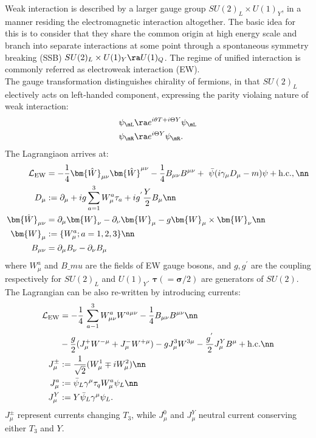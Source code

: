 Weak interaction is described by a larger gauge group $SU(2)_L \times U(1)_Y$, in a manner residing the electromagnetic interaction altogether. The basic idea for this is to consider that they share the common origin at high energy scale and branch into separate interactions at some point through a spontaneous symmetry breaking (SSB) $SU(2)_L \times U(1)_Y \ra U(1)_Q$.
The regime of unified interaction is commonly referred as electroweak interaction (EW). \\

The gauge transformation distinguishes chirality of fermions, in that $SU(2)_L$ electively acts on left-handed component, expressing the parity violaing nature of weak interaction:
\begin{align}
& \psi_{\mL} \ra e^{i\theta T+i\Theta Y} \psi_{\mL}   \\
& \psi_{\mR} \ra e^{i\Theta Y} \psi_{\mR}.
\end{align}
The Lagrangiaon arrives at:
\begin{align}
\mathcal{L}_{\mathrm{EW}} & = -\frac{1}{4} \bm{\hat{W}}_{\mu\nu} \bm{\hat{W}}^{\mu\nu}-\frac{1}{4}B_{\mu\nu} B^{\mu\nu} + \,\, \bar{\psi}(i \gamma_\mu D_\mu - m) \psi + \mathrm{h.c.}, \nn \\
%
D_\mu & := \partial_\mu + ig \sum_{a=1}^3 W^a_{\mu} \tau_a  + ig^{'} \frac{Y}{2} B_\mu \nn \\
\bm{\hat{W}}_{\mu\nu} & = \partial_\mu \bm{W}_\nu - \partial_\nu \bm{W}_\mu - g \bm{W}_\mu \times \bm{W}_\nu \nn \\
\bm{W}_\mu & := \{W^a_\mu; a=1,2,3\} \nn \\
B_{\mu\nu} & = \partial_\mu B_\nu - \partial_\nu B_\mu
\label{eq::EWLag1}
\end{align}
where $W^a_\mu$ and $B\_mu$ are the fields of EW gauge bosons, and $g, g^{'}$ are the coupling respectively for $SU(2)_L$ and $U(1)_Y$. $\bm{\tau} (= \bm{\sigma}/2)$ are generators of $SU(2)$. \\

The Lagrangian can be also re-written by introducing currents:
\begin{align}
\mathcal{L}_{\mathrm{EW}} & = -\frac{1}{4} \, \sum_{a-1}^3 W^a_{\mu\nu} W^{a\mu\nu}-\frac{1}{4}B_{\mu\nu} B^{\mu\nu} \nn \\
& -\frac{g}{2} (J_\mu^+ W^{-\mu} + J_\mu^- W^{+\mu}) -g J_\mu^3 W^{3\mu} - \frac{g^{'}}{2}J_\mu^YB^\mu  + \mathrm{h.c.}  \nn \\
 J^{\pm}_\mu & := \frac{1}{\sqrt{2}} (W_\mu^1\mp iW_\mu^2) \nn \\
 J^a_\mu & := \bar{\psi}_L \gamma^\mu \tau_q W_\mu^a \psi_L \nn \\
 J^Y_\mu & := Y \bar{\psi}_L \gamma^\mu  \psi_L.
\label{eq::EWLag2}
\end{align}
$J_\mu^\pm$ represent currents changing $T_3$, while $J_\mu^0$ and $J_\mu^Y$ neutral current conserving either $T_3$ and $Y$. \\

